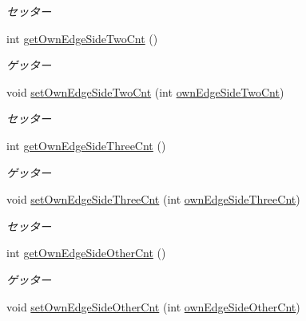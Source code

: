 \begin{DoxyCompactItemize}
\begin{DoxyCompactList}\small\item\em セッター \end{DoxyCompactList}\item 
int \hyperlink{classjp_1_1gr_1_1java__conf_1_1yuta__yoshinaga_1_1reversi_1_1model_1_1_reversi_anz_ae54501452ffdbc9834bce07bddb129e8}{get\+Own\+Edge\+Side\+Two\+Cnt} ()
\begin{DoxyCompactList}\small\item\em ゲッター \end{DoxyCompactList}\item 
void \hyperlink{classjp_1_1gr_1_1java__conf_1_1yuta__yoshinaga_1_1reversi_1_1model_1_1_reversi_anz_a2275456b67f846c90e37b8e726b46aa6}{set\+Own\+Edge\+Side\+Two\+Cnt} (int \hyperlink{classjp_1_1gr_1_1java__conf_1_1yuta__yoshinaga_1_1reversi_1_1model_1_1_reversi_anz_a9b68f981fedda545813bfdabf076dd03}{own\+Edge\+Side\+Two\+Cnt})
\begin{DoxyCompactList}\small\item\em セッター \end{DoxyCompactList}\item 
int \hyperlink{classjp_1_1gr_1_1java__conf_1_1yuta__yoshinaga_1_1reversi_1_1model_1_1_reversi_anz_a740171debdb292e8cce2793803b8292e}{get\+Own\+Edge\+Side\+Three\+Cnt} ()
\begin{DoxyCompactList}\small\item\em ゲッター \end{DoxyCompactList}\item 
void \hyperlink{classjp_1_1gr_1_1java__conf_1_1yuta__yoshinaga_1_1reversi_1_1model_1_1_reversi_anz_a0ce858afa1508c93ca52c33fa4eb2f32}{set\+Own\+Edge\+Side\+Three\+Cnt} (int \hyperlink{classjp_1_1gr_1_1java__conf_1_1yuta__yoshinaga_1_1reversi_1_1model_1_1_reversi_anz_a359e1ed55ca330a4003712687175622b}{own\+Edge\+Side\+Three\+Cnt})
\begin{DoxyCompactList}\small\item\em セッター \end{DoxyCompactList}\item 
int \hyperlink{classjp_1_1gr_1_1java__conf_1_1yuta__yoshinaga_1_1reversi_1_1model_1_1_reversi_anz_a14c2d33d5da811348a1874ac10d0b735}{get\+Own\+Edge\+Side\+Other\+Cnt} ()
\begin{DoxyCompactList}\small\item\em ゲッター \end{DoxyCompactList}\item 
void \hyperlink{classjp_1_1gr_1_1java__conf_1_1yuta__yoshinaga_1_1reversi_1_1model_1_1_reversi_anz_ac636e4020b682188e70e3b983fd3d4e4}{set\+Own\+Edge\+Side\+Other\+Cnt} (int \hyperlink{classjp_1_1gr_1_1java__conf_1_1yuta__yoshinaga_1_1reversi_1_1model_1_1_reversi_anz_a121fe0545fa943b662392eac6e5d6f5e}{own\+Edge\+Side\+Other\+Cnt})

\end{DoxyCompactItemize}
